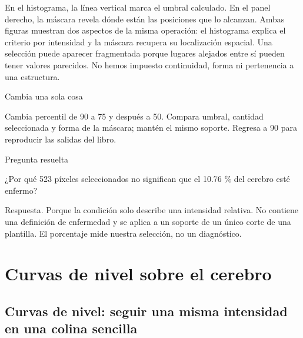 

En el histograma, la línea vertical marca el umbral calculado. En el panel derecho, la máscara revela dónde están las posiciones que lo alcanzan. Ambas figuras muestran dos aspectos de la misma operación: el histograma explica el criterio por intensidad y la máscara recupera su localización espacial. Una selección puede aparecer fragmentada porque lugares alejados entre sí pueden tener valores parecidos. No hemos impuesto continuidad, forma ni pertenencia a una estructura.



\begin{Practica}{Cambia una sola cosa}

Cambia percentil de 90 a 75 y después a 50. Compara umbral, cantidad seleccionada y forma de la máscara; mantén el mismo soporte. Regresa a 90 para reproducir las salidas del libro.


\end{Practica}


\begin{Idea}{Pregunta resuelta}

¿Por qué 523 píxeles seleccionados no significan que el 10.76 \% del cerebro esté enfermo?


Respuesta. Porque la condición solo describe una intensidad relativa. No contiene una definición de enfermedad y se aplica a un soporte de un único corte de una plantilla. El porcentaje mide nuestra selección, no un diagnóstico.


\end{Idea}

\chapter[Curvas de nivel]{Curvas de nivel sobre el cerebro}

\label{cap:curvas}

\section{Curvas de nivel: seguir una misma intensidad en una colina sencilla}

